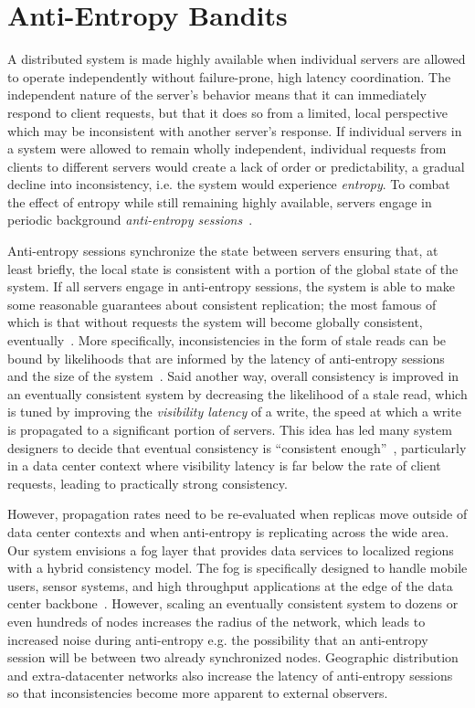 \section{Anti-Entropy Bandits}

A distributed system is made highly available when individual servers are
allowed to operate independently without failure-prone, high latency
coordination.
The independent nature of the server's behavior means that it can immediately
respond to client requests, but that it does so from a limited, local
perspective which may be inconsistent with another server's response.
If individual servers in a system were allowed to remain wholly independent,
individual requests from clients to different servers would create a lack of
order or predictability, a gradual decline into inconsistency, i.e. the
system would experience \textit{entropy}.
To combat the effect of entropy while still remaining highly available,
servers engage in periodic background \textit{anti-entropy
  sessions}~\cite{bayou}.

Anti-entropy sessions synchronize the state between servers ensuring that,
at least briefly, the local state is consistent with a portion of the global
state of the system.
If all servers engage in anti-entropy sessions, the system is able to make
some reasonable guarantees about consistent replication; the most famous
of which is that without requests the system will become
globally consistent, eventually~\cite{anti_entropy}.
More specifically, inconsistencies in the form of stale reads can be bound by
likelihoods that are informed by the latency of anti-entropy sessions and the
size of the system~\cite{probabilistically_bounded_staleness,quantifying_pbs}.
Said another way, overall consistency is improved in an eventually consistent
system by decreasing the likelihood of a stale read, which is tuned by
improving the \textit{visibility latency} of a write, the speed at which a
write is propagated to a significant portion of servers.
This idea has led many system designers to decide that eventual consistency
is ``consistent enough''~\cite{bermbach_eventual_2011,wada_data_2011},
particularly in a data center context where visibility latency is far below
the rate of client requests, leading to practically strong consistency.

However, propagation rates need to be re-evaluated when replicas move outside of data center contexts and when anti-entropy is replicating across the wide area.
Our system envisions a fog layer that provides data services to localized regions with a hybrid consistency model.
The fog is specifically designed to handle mobile users, sensor systems, and high throughput applications at the edge of the data center backbone~\cite{edge_computing,geo_cdn}.
However, scaling an eventually consistent system to dozens or even hundreds
of nodes increases the radius of the network, which leads to increased noise
during anti-entropy e.g. the possibility that an anti-entropy session will be
between two already synchronized nodes.
Geographic distribution and extra-datacenter networks also increase the
latency of anti-entropy sessions so that inconsistencies become more apparent
to external observers.

